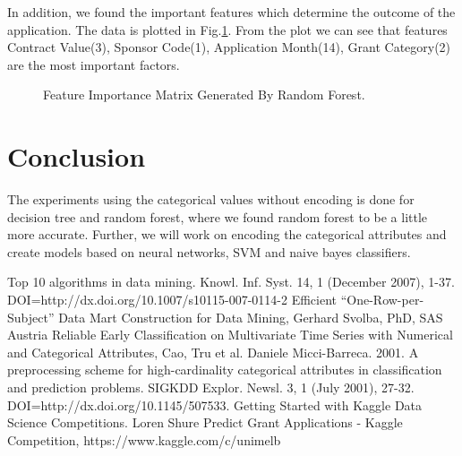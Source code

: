 \documentclass{article} %
\begin{document}
In addition, we found the important features which determine the outcome of the application. The data is plotted in Fig.\ref{fig:FIM}. From the plot we can see that features Contract Value(3), Sponsor Code(1), Application Month(14), Grant Category(2) are the most important factors.

\begin{figure}[h]
	\begin{center}
	\end{center}
	\caption{Feature Importance Matrix Generated By Random Forest.}
	\label{fig:FIM}
\end{figure}


\section{Conclusion}
The experiments using the categorical values without encoding is done for decision tree and random forest, where we found random forest to be a little more accurate. Further, we will work on encoding the categorical attributes and create models based on neural networks, SVM and naive bayes classifiers.

\begin{thebibliography}{10} %
	 Top 10 algorithms in data mining. Knowl. Inf. Syst. 14, 1 (December 2007), 1-37. DOI=http://dx.doi.org/10.1007/s10115-007-0114-2
	 Efficient “One-Row-per-Subject” Data Mart Construction for Data Mining, Gerhard Svolba, PhD, SAS Austria
	 Reliable Early Classification on Multivariate Time Series with Numerical and Categorical Attributes, Cao, Tru et al.
	Daniele Micci-Barreca. 2001. A preprocessing scheme for high-cardinality categorical attributes in classification and prediction problems. SIGKDD Explor. Newsl. 3, 1 (July 2001), 27-32. DOI=http://dx.doi.org/10.1145/507533.
	 Getting Started with Kaggle Data Science Competitions. Loren Shure
	 Predict Grant Applications - Kaggle Competition, https://www.kaggle.com/c/unimelb 
\end{thebibliography}
\end{document}
